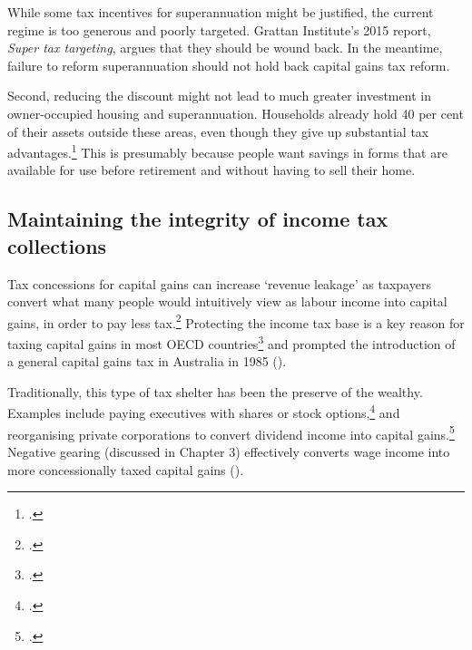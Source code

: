 While some tax incentives for superannuation might be justified, the current regime is too generous and poorly targeted. Grattan Institute’s 2015 report, \textit{Super tax targeting}, argues that they should be wound back. %
In the meantime, failure to reform superannuation should not hold back capital gains tax reform. 

Second, reducing the discount might not lead to much greater investment in owner-occupied housing and superannuation. Households already hold 40 per cent of their assets outside these areas, even though they give up substantial tax advantages.\footcite{ABS2015HousingFinance} This is presumably because people want savings in forms that are available for use before retirement and without having to sell their home.  


\subsection{Maintaining the integrity of income tax collections}
Tax concessions for capital gains can increase ‘revenue leakage’ as taxpayers convert what many people would intuitively view as labour income into capital gains, in order to pay less tax.\footcites{Evans2005}{MinasLim2013} Protecting the income tax base is a key reason for taxing capital gains in most OECD countries\footcite{OECD2006TaxationOfCapitalGains}  and prompted the introduction of a general capital gains tax in Australia in 1985 (). 

Traditionally, this type of tax shelter has been the preserve of the wealthy. Examples include paying executives with shares or stock options,\footcite[][8--9]{Ingles2009TaxEquity} and reorganising private corporations to convert dividend income into capital gains.\footcite{MinasLim2013} Negative gearing (discussed in Chapter 3) effectively converts wage income into more concessionally taxed capital gains ().  

